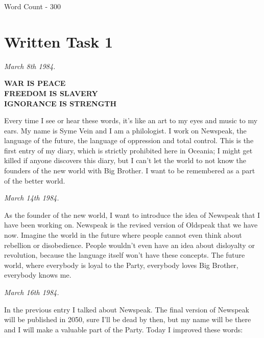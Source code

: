 \documentclass[12pt,a4paper]{article}
\begin{document}
Word Count - 300

\newpage
{}
\section*{Written Task 1}
\begin{flushleft}
  \textit{March 8th 1984.}
  \end{flushleft}

\begin{center}
  \textbf{WAR IS PEACE}\\
  \textbf{FREEDOM IS SLAVERY}\\
  \textbf{IGNORANCE IS STRENGTH}\\
\end{center}

Every time I see or hear these words, it’s like an art to my eyes and music to my ears. My name is Syme Vein and I am a philologist. I work on Newspeak, the language of the future, the language of oppression and total control. This is the first entry of my diary, which is strictly prohibited here in Oceania; I might get killed if anyone discovers this diary, but I can’t let the world to not know the founders of the new world with Big Brother. I want to be remembered as a part of the better world. \\


\begin{flushleft}
  \textit{March 14th 1984.}
  \end{flushleft}

As the founder of the new world, I want to introduce the idea of Newspeak that I have been working on. Newspeak is the revised version of Oldspeak that we have now. Imagine the world in the future where people cannot even think about rebellion or disobedience. People wouldn’t even have an idea about disloyalty or revolution, because the language itself won’t have these concepts. The future world, where everybody is loyal to the Party, everybody loves Big Brother, everybody knows me.

\newpage

\begin{flushleft}
  \textit{March 16th 1984.}
  \end{flushleft}

In the previous entry I talked about Newspeak. The final version of Newspeak will be published in 2050, sure I'll be dead by then, but my name will be there and I will make a valuable part of the Party. Today I improved these words:\\
\end{document}
